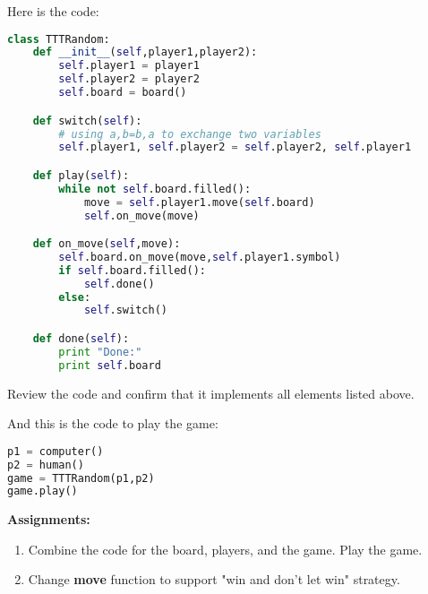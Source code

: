 Here is the code:

\begin{lstlisting}[language=Python,style=codelst2,caption={Tic-Tac-Toe: the game}]
class TTTRandom:
    def __init__(self,player1,player2):
        self.player1 = player1
        self.player2 = player2
        self.board = board()

    def switch(self):
        # using a,b=b,a to exchange two variables
        self.player1, self.player2 = self.player2, self.player1

    def play(self):
        while not self.board.filled():
            move = self.player1.move(self.board)
            self.on_move(move)

    def on_move(self,move):
        self.board.on_move(move,self.player1.symbol)
        if self.board.filled():
            self.done()
        else:
            self.switch()

    def done(self):
        print "Done:"
        print self.board
\end{lstlisting}
Review the code and confirm that it implements all elements listed above.

And this is the code to play the game:

\begin{lstlisting}[language=Python,style=codelst2,caption={Tic-Tac-Toe: playing the game}]
p1 = computer()
p2 = human()
game = TTTRandom(p1,p2)
game.play()
\end{lstlisting}

\textbf{Assignments:}
\begin{enumerate}
\item Combine the code for the board, players, and the game. Play the game.
\item Change \textbf{move} function to support "win and don't let win"
strategy.
\end{enumerate}





